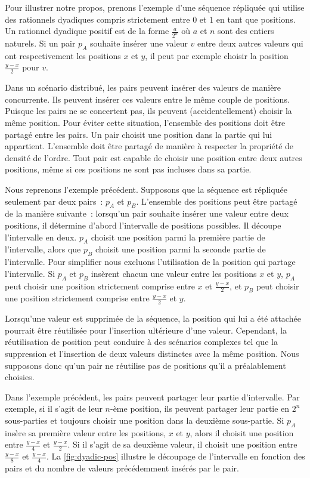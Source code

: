 Pour illustrer notre propos, prenons l'exemple d'une séquence répliquée qui utilise des rationnels dyadiques compris strictement entre $0$ et $1$ en tant que positions.
Un rationnel dyadique positif est de la forme $\frac{a}{2^n}$ où $a$ et $n$ sont des entiers naturels.
Si un pair $p_A$ souhaite insérer une valeur $v$ entre deux autres valeurs qui ont respectivement les positions $x$ et $y$, il peut par exemple choisir la position $\frac{y-x}{2}$ pour $v$.

Dans un scénario distribué, les pairs peuvent insérer des valeurs de manière concurrente.
Ils peuvent insérer ces valeurs entre le même couple de positions.
Puisque les pairs ne se concertent pas, ils peuvent (accidentellement) choisir la même position.
Pour éviter cette situation, l'ensemble des positions doit être partagé entre les pairs.
Un pair choisit une position dans la partie qui lui appartient.
L'ensemble doit être partagé de manière à respecter la propriété de densité de l'ordre.
Tout pair est capable de choisir une position entre deux autres positions, même si ces positions ne sont pas incluses dans sa partie.

Nous reprenons l'exemple précédent.
Supposons que la séquence est répliquée seulement par deux pairs~: $p_A$ et $p_B$.
L'ensemble des positions peut être partagé de la manière suivante~: lorsqu'un pair souhaite insérer une valeur entre deux positions, il détermine d'abord l'intervalle de positions possibles.
Il découpe l'intervalle en deux.
$p_A$ choisit une position parmi la première partie de l'intervalle, alors que $p_B$ choisit une position parmi la seconde partie de l'intervalle.
Pour simplifier nous excluons l'utilisation de la position qui partage l'intervalle.
Si $p_A$ et $p_B$ insèrent chacun une valeur entre les positions $x$ et $y$, $p_A$ peut choisir une position strictement comprise entre $x$ et $\frac{y-x}{2}$, et $p_B$ peut choisir une position strictement comprise entre $\frac{y-x}{2}$ et $y$.

Lorsqu'une valeur est supprimée de la séquence, la position qui lui a été attachée pourrait être réutilisée pour l'insertion ultérieure d'une valeur.
Cependant, la réutilisation de position peut conduire à des scénarios complexes tel que la suppression et l'insertion de deux valeurs distinctes avec la même position.
Nous supposons donc qu'un pair ne réutilise pas de positions qu'il a préalablement choisies.

Dans l'exemple précédent, les pairs peuvent partager leur partie d'intervalle.
Par exemple, si il s'agit de leur $n$-ème position, ils peuvent partager leur partie en $2^n$ sous-parties et toujours choisir une position dans la deuxième sous-partie.
Si $p_A$ insère sa première valeur entre les positions, $x$ et $y$, alors il choisit une position entre $\frac{y-x}{4}$ et $\frac{y-x}{2}$.
Si il s'agit de sa deuxième valeur, il choisit une position entre $\frac{y-x}{8}$ et $\frac{y-x}{4}$.
La \autoref{fig:dyadic-pos} illustre le découpage de l'intervalle en fonction des pairs et du nombre de valeurs précédemment insérés par le pair.

